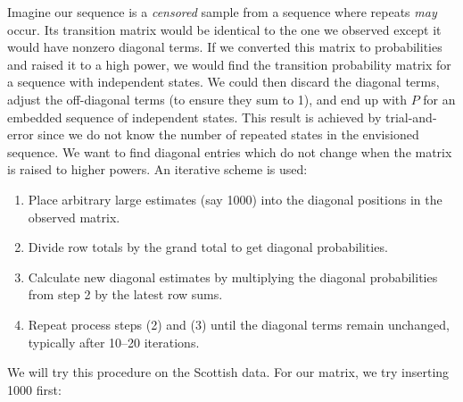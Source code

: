 \begin{example}
	Imagine our sequence is a \emph{censored} sample from a sequence where repeats \emph{may} occur.  Its 
transition matrix would be identical to the one we observed except it would have nonzero 
diagonal terms.  If we converted this matrix to probabilities and raised it to a high power, we 
would find the transition probability matrix for a sequence with independent states.  We could 
then discard the diagonal terms, adjust the off-diagonal terms (to ensure they sum to 1), and end up with $P$ 
for an embedded sequence of independent states.  This result is achieved by trial-and-error 
since we do not know the number of repeated states in the envisioned sequence.  We want to find 
diagonal entries which do not change when the matrix is raised to higher powers.  An iterative scheme is used:
\begin{enumerate}
\item	Place arbitrary large estimates (say 1000) into the diagonal positions in the observed 
matrix.
\item	Divide row totals by the grand total to get diagonal probabilities.
\item	Calculate new diagonal estimates by multiplying the diagonal probabilities from step 2 by the 
latest row sums.
\item	Repeat process steps (2) and (3) until the diagonal terms remain unchanged, typically after 
10--20 iterations.
\end{enumerate}
We will try this procedure on the Scottish data.  For our matrix, we try inserting 1000 first:
\begin{equation}

\end{equation}
\end{example}
